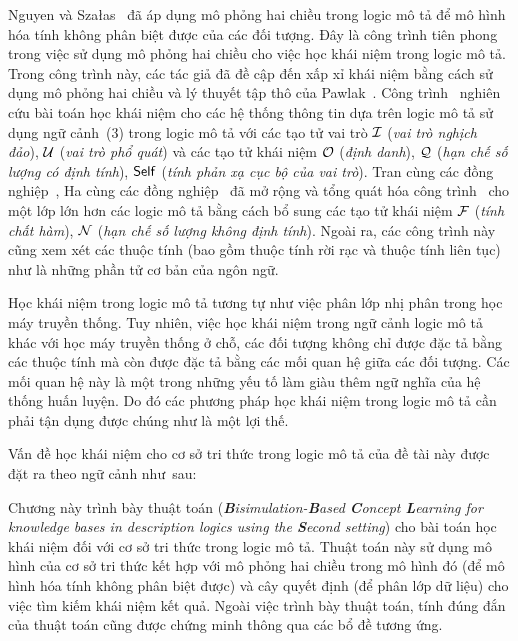 Nguyen và Sza{\l}as~\cite{Nguyen2013} đã áp dụng mô phỏng hai chiều trong logic mô tả để mô hình hóa tính không phân biệt được của các đối tượng. Đây là công trình tiên phong trong việc sử dụng mô phỏng hai chiều cho việc học khái niệm trong logic mô tả. Trong công trình này, các tác giả đã đề cập đến xấp xỉ khái niệm bằng cách sử dụng mô phỏng hai chiều và lý thuyết tập thô của Pawlak~\cite{Pawlak1992,Pawlak2007}. 
Công trình~\cite{Nguyen2013} nghiên cứu bài toán học khái niệm cho các hệ thống thông tin dựa trên logic mô tả sử dụng ngữ cảnh~(3) trong logic mô tả \ALC với các tạo tử vai trò $\mathcal{I}$ ({\em vai trò nghịch đảo}), $\mathcal{U}$ ({\em vai trò phổ quát}) và các tạo tử khái niệm $\mathcal{O}$ ({\em định danh}), $\mathcal{Q}$ ({\em hạn chế số lượng có định tính}), $\mathsf{Self}$ ({\em tính phản xạ cục bộ của vai trò}).
Tran cùng các đồng nghiệp~\cite{Tran2012}, Ha cùng các đồng nghiệp~\cite{Ha2012} đã mở rộng và tổng quát hóa công trình~\cite{Nguyen2013} cho một lớp lớn hơn các logic mô tả bằng cách bổ sung các tạo tử khái niệm $\mathcal{F}$ ({\em tính chất hàm}), $\mathcal{N}$ ({\em hạn chế số lượng không định tính}). Ngoài ra, các công trình này cũng xem xét các thuộc tính (bao gồm thuộc tính rời rạc và thuộc tính liên tục) như là những phần tử cơ bản của ngôn ngữ.

Học khái niệm trong logic mô tả tương tự như việc phân lớp nhị phân trong học máy truyền thống. Tuy nhiên, việc học khái niệm trong ngữ cảnh logic mô tả khác với học máy truyền thống ở chỗ, các đối tượng không chỉ được đặc tả bằng các thuộc tính mà còn được đặc tả bằng các mối quan hệ giữa các đối tượng. Các mối quan hệ này là một trong những yếu tố làm giàu thêm ngữ nghĩa của hệ thống huấn luyện. Do đó các phương pháp học khái niệm trong logic mô tả cần phải tận dụng được chúng như là một lợi thế.

Vấn đề học khái niệm cho cơ sở tri thức trong logic mô tả của đề tài này được đặt ra theo ngữ cảnh như~sau:

\noindent
{}

Chương này trình bày thuật toán {\em \BBCLearnS} ({\em \textbf{B}isimulation-\textbf{B}ased \textbf{C}oncept \textbf{L}earning for knowledge bases in description logics using the \textbf{S}econd setting}) cho bài toán học khái niệm đối với cơ sở tri thức trong logic mô tả. Thuật toán này sử dụng mô hình của cơ sở tri thức kết hợp với mô phỏng hai chiều trong mô hình đó (để mô hình hóa tính không phân biệt được) và cây quyết định (để phân lớp dữ liệu) cho việc tìm kiếm khái niệm kết quả. Ngoài việc trình bày thuật toán, tính đúng đắn của thuật toán cũng được chứng minh thông qua các bổ đề tương ứng.


